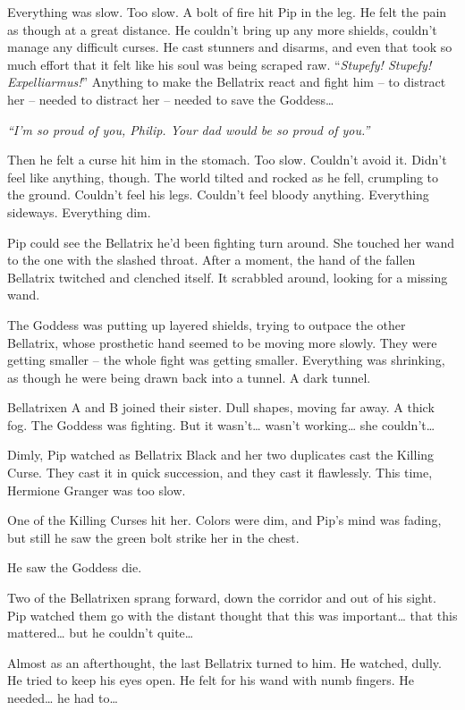 Everything was slow. Too slow. A bolt of fire hit Pip in the leg. He
felt the pain as though at a great distance. He couldn't bring up any
more shields, couldn't manage any difficult curses. He cast stunners and
disarms, and even that took so much effort that it felt like his soul
was being scraped raw. ``\emph{Stupefy! Stupefy! Expelliarmus!}''
Anything to make the Bellatrix react and fight him -- to distract her --
needed to distract her -- needed to save the Goddess\ldots{}

\emph{``I'm so proud of you, Philip. Your dad would be so proud of
you.''}

Then he felt a curse hit him in the stomach. Too slow. Couldn't avoid
it. Didn't feel like anything, though. The world tilted and rocked as he
fell, crumpling to the ground. Couldn't feel his legs. Couldn't feel
bloody anything. Everything sideways. Everything dim.

Pip could see the Bellatrix he'd been fighting turn around. She touched
her wand to the one with the slashed throat. After a moment, the hand of
the fallen Bellatrix twitched and clenched itself. It scrabbled around,
looking for a missing wand.

The Goddess was putting up layered shields, trying to outpace the other
Bellatrix, whose prosthetic hand seemed to be moving more slowly. They
were getting smaller -- the whole fight was getting smaller. Everything
was shrinking, as though he were being drawn back into a tunnel. A dark
tunnel.

Bellatrixen A and B joined their sister. Dull shapes, moving far away. A
thick fog. The Goddess was fighting. But it wasn't\ldots{} wasn't
working\ldots{} she couldn't\ldots{}

Dimly, Pip watched as Bellatrix Black and her two duplicates cast the
Killing Curse. They cast it in quick succession, and they cast it
flawlessly. This time, Hermione Granger was too slow.

One of the Killing Curses hit her. Colors were dim, and Pip's mind was
fading, but still he saw the green bolt strike her in the chest.

He saw the Goddess die.

Two of the Bellatrixen sprang forward, down the corridor and out of his
sight. Pip watched them go with the distant thought that this was
important\ldots{} that this mattered\ldots{} but he couldn't
quite\ldots{}

Almost as an afterthought, the last Bellatrix turned to him. He watched,
dully. He tried to keep his eyes open. He felt for his wand with numb
fingers. He needed\ldots{} he had to\ldots{}

